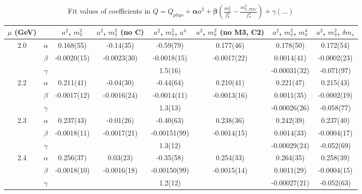 \documentclass[12pt]{extarticle}
\begin{document}
\begin{table}[h!]
\begin{center}
\begin{tabular}{|c c|c|c|c|c|c|c|}
\hline
$\mu$ (GeV) &  & $a^2$, $m_\pi^2$& $a^2$, $m_\pi^2$ (no C)& $a^2$, $m_\pi^2$, $a^4$& $a^2$, $m_\pi^2$ (no M3, C2)& $a^2$, $m_\pi^2$, $m_\pi^4$& $a^2$, $m_\pi^2$, $\delta m_s$\\
\hline
\multirow{3}{0.5in}{2.0} & $\alpha$ & 0.168(55)& -0.14(35)& -0.59(79)& 0.177(46)& 0.178(50)& 0.172(54)\\
 & $\beta$ & -0.0020(15)& -0.0023(30)& -0.0018(15)& -0.0017(22)& 0.0014(41)& -0.0002(23)\\
 & $\gamma$ &  &  & 1.5(16)&  & -0.00031(32)& -0.071(97)\\
\hline
\multirow{3}{0.5in}{2.2} & $\alpha$ & 0.211(41)& -0.04(30)& -0.44(64)& 0.210(41)& 0.221(47)& 0.215(43)\\
 & $\beta$ & -0.0017(12)& -0.0016(24)& -0.0014(11)& -0.0013(16)& 0.0011(35)& -0.0002(19)\\
 & $\gamma$ &  &  & 1.3(13)&  & -0.00026(26)& -0.058(77)\\
\hline
\multirow{3}{0.5in}{2.3} & $\alpha$ & 0.237(43)& -0.01(26)& -0.40(63)& 0.238(36)& 0.242(39)& 0.237(40)\\
 & $\beta$ & -0.0018(11)& -0.0017(21)& -0.00151(99)& -0.0014(15)& 0.0014(33)& -0.0004(17)\\
 & $\gamma$ &  &  & 1.3(12)&  & -0.00029(24)& -0.052(69)\\
\hline
\multirow{3}{0.5in}{2.4} & $\alpha$ & 0.256(37)& 0.03(23)& -0.35(58)& 0.254(33)& 0.264(35)& 0.258(39)\\
 & $\beta$ & -0.0018(10)& -0.0016(18)& -0.00150(99)& -0.0015(14)& 0.0011(29)& -0.0004(15)\\
 & $\gamma$ &  &  & 1.2(12)&  & -0.00027(21)& -0.052(63)\\
\hline
\end{tabular}
\caption{Fit values of coefficients in $Q = Q_{phys} + \mathbf{\alpha} a^2 + \mathbf{\beta}\left(\frac{m_\pi^2}{f_\pi^2}-\frac{m_{\pi,PDG}^2}{f_\pi^2}\right) + \gamma(\ldots)$}
\end{center}
\end{table}






\end{document}
